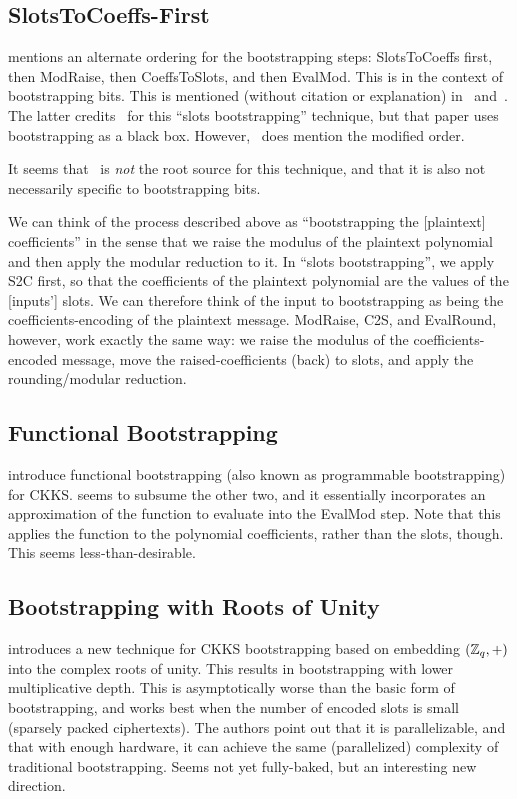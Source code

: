 \documentclass[../fheimpl.tex]{subfiles}
\begin{document}
    \subsection{SlotsToCoeffs-First}
    \cite{cryptoeprint:2024/767} mentions an alternate ordering for the bootstrapping steps: SlotsToCoeffs first, then ModRaise, then CoeffsToSlots, and then EvalMod. This is in the context of bootstrapping bits. This is mentioned (without citation or explanation) in~\cite{cryptoeprint:2024/1284} and~\cite[Footnote 3]{cryptoeprint:2024/1638}. The latter credits~\cite{cryptoeprint:2022/1167} for this ``slots bootstrapping'' technique, but that paper uses bootstrapping as a black box. However,~\cite{cryptoeprint:2022/1167} does mention the modified order.
    
    It seems that~\cite{cryptoeprint:2024/767} is \emph{not} the root source for this technique, and that it is also not necessarily specific to bootstrapping bits.
    
    We can think of the process described above as ``bootstrapping the [plaintext] coefficients'' in the sense that we raise the modulus of the plaintext polynomial and then apply the modular reduction to it. In ``slots bootstrapping'', we apply S2C first, so that the coefficients of the plaintext polynomial are the values of the [inputs'] slots. We can therefore think of the input to bootstrapping as being the coefficients-encoding of the plaintext message. ModRaise, C2S, and EvalRound, however, work exactly the same way: we raise the modulus of the coefficients-encoded message, move the raised-coefficients (back) to slots, and apply the rounding/modular reduction.
    
    
    
    
    \subsection{Functional Bootstrapping}
    \cite{cryptoeprint:2024/1623, cryptoeprint:2024/1637, cryptoeprint:2024/1638} introduce functional bootstrapping (also known as programmable bootstrapping) for CKKS. \cite{cryptoeprint:2024/1623} seems to subsume the other two, and it essentially incorporates an approximation of the function to evaluate into the \textsf{EvalMod} step. Note that this applies the function to the polynomial coefficients, rather than the slots, though. This seems less-than-desirable. 

    \subsection{Bootstrapping with Roots of Unity}
    \cite{cryptoeprint:2025/651} introduces a new technique for CKKS bootstrapping based on embedding $(\mathbb{Z}_q,+)$ into the complex roots of unity. This results in bootstrapping with lower multiplicative depth. This is asymptotically worse than the basic form of bootstrapping, and works best when the number of encoded slots is small (sparsely packed ciphertexts). The authors point out that it is parallelizable, and that with enough hardware, it can achieve the same (parallelized) complexity of traditional bootstrapping. Seems not yet fully-baked, but an interesting new direction.
\end{document}
